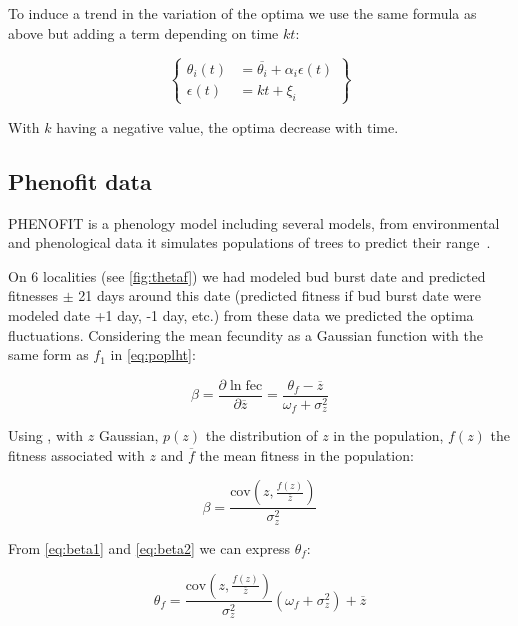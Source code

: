 To induce a trend in the variation of the optima we use the same formula as above but adding a term depending on time $kt$:

\begin{equation}
	\label{eq:kt}
	\left\{
	\begin{aligned}
		\theta_i(t) &= \overline{\theta_i} + \alpha_i\epsilon(t) \\
		\epsilon(t) &= kt + \xi_i
	\end{aligned}
	\right\}
\end{equation}

With $k$ having a negative value, the optima decrease with time.

\subsection*{Phenofit data}

\textsc{PHENOFIT} is a phenology model including several models, from environmental and phenological data it simulates populations of trees to predict their range~\citep{morin_tree_2008}.

On 6 localities (see \autoref{fig:thetaf}) we had modeled bud burst date and predicted fitnesses $\pm$ 21 days around this date (predicted fitness if bud burst date were modeled date +1 day, -1 day, etc.) from these data we predicted the optima fluctuations. Considering the mean fecundity as a Gaussian function with the same form as $f_1$ in \autoref{eq:poplht}:

\begin{equation}
	\label{eq:beta1}
	\beta = \frac{\partial \ln \text{fec}}{\partial \overline{z}} = \frac{\theta_f - \overline{z}}{\omega_f + \sigma_z^2}
\end{equation}

Using \citep{lande_measurement_1983}, with $z$ Gaussian, $p(z)$ the distribution of $z$ in the population, $f(z)$ the fitness associated with $z$ and $\overline{f}$ the mean fitness in the population:

\begin{equation}
	\label{eq:beta2}
	\beta = \frac{\text{cov}(z, \frac{f(z)}{\overline{z}})}{\sigma_z^2}
\end{equation}

From \eqref{eq:beta1} and \eqref{eq:beta2} we can express $\theta_f$:

\begin{equation}
	\theta_f = \frac{\text{cov}(z, \frac{f(z)}{\overline{z}})}{\sigma_z^2} (\omega_f + \sigma_z^2) + \overline{z}
\end{equation}

